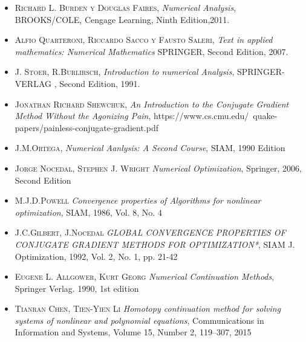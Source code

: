 \documentclass[\OPTfontsize, twoside]{book}
\begin{document}
\begin{itemize}
  \setlength\itemsep{1em}
  \item \textsc{Richard L. Burden y Douglas Faires}, \emph{Numerical Analysis}, BROOKS/COLE, Cengage Learning, Ninth Edition,2011.
  \item \textsc{Alfio Quarteroni, Riccardo Sacco y Fausto Saleri}, \emph{Text in applied mathematics: Numerical Mathematics} SPRINGER, Second Edition, 2007.
  \item \textsc{J. Stoer, R.Burlirsch}, \emph{Introduction to numerical Analysis}, SPRINGER-VERLAG , Second Edition, 1991.
  \item \textsc{Jonathan Richard Shewchuk}, \emph{An Introduction to the Conjugate Gradient Method	Without the Agonizing Pain}, https://www.cs.cmu.edu/~quake-papers/painless-conjugate-gradient.pdf
  \item \textsc{J.M.Ortega}, \emph{Numerical Aanlysis: A Second Course}, SIAM, 1990 Edition
  \item \textsc{Jorge Nocedal, Stephen J. Wright} \emph{Numerical Optimization}, Springer, 2006, Second Edition
  \item \textsc{M.J.D.Powell} \emph{Convergence properties of Algorithms for nonlinear optimization}, SIAM, 1986, Vol. 8, No. 4
  \item \textsc{J.C.Gilbert, J.Nocedal} \emph{GLOBAL CONVERGENCE PROPERTIES OF
  	CONJUGATE GRADIENT METHODS FOR OPTIMIZATION*}, SIAM J. Optimization, 1992, Vol. 2, No. 1, pp. 21-42
  \item \textsc{Eugene L. Allgower, Kurt Georg} \emph{Numerical Continuation Methods}, Springer Verlag. 1990, 1st edition
  \item \textsc{Tianran Chen, Tien-Yien Li} \emph{Homotopy continuation method for solving systems of nonlinear and polynomial equations}, Communications in Information and Systems, Volume 15, Number 2, 119–307, 2015
\end{itemize}

\printindex
\end{document}
